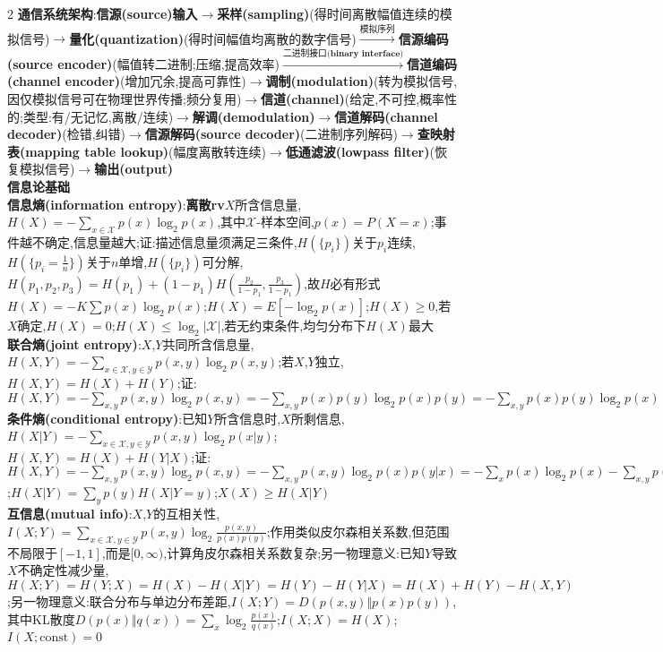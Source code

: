 \documentclass[UTF8,a4paper,10pt]{article}
\providecommand{\abs}[1]{\left\lvert#1\right\rvert}
\begin{document}
\scriptsize
\begin{multicols*}{2}
\noindent\textbf{通信系统架构}:\textbf{信源(source)输入}$\rightarrow$\textbf{采样(sampling)}(得时间离散幅值连续的模拟信号)$\rightarrow$\textbf{量化(quantization)}(得时间幅值均离散的数字信号)$\overset{\textbf{模拟序列}}{\longrightarrow}$\textbf{信源编码(source encoder)}(幅值转二进制;压缩,提高效率)$\overset{\textbf{二进制接口(binary interface)}}{\longrightarrow}$\textbf{信道编码(channel encoder)}(增加冗余,提高可靠性)$\rightarrow$\textbf{调制(modulation)}(转为模拟信号,因仅模拟信号可在物理世界传播;频分复用)$\rightarrow$\textbf{信道(channel)}(给定,不可控,概率性的;类型:有/无记忆,离散/连续)$\rightarrow$\textbf{解调(demodulation)}$\rightarrow$\textbf{信道解码(channel decoder)}(检错,纠错)$\rightarrow$\textbf{信源解码(source decoder)}(二进制序列解码)$\rightarrow$\textbf{查映射表(mapping table lookup)}(幅度离散转连续)$\rightarrow$\textbf{低通滤波(lowpass filter)}(恢复模拟信号)$\rightarrow$\textbf{输出(output)}\\
\textbf{信息论基础}\hrulefill\\
\textbf{信息熵(information entropy)}:\textbf{离散rv}$X$所含信息量,$H(X)=-\sum_{x\in\mathcal{X}}p(x)\log_2p(x)$,其中$\mathcal{X}$-样本空间,$p(x)=P(X=x)$;事件越不确定,信息量越大;证:描述信息量须满足三条件,$H(\{p_i\})$关于$p_i$连续,$H(\{p_i=\frac{1}{n}\})$关于$n$单增,$H(\{p_i\})$可分解,$H(p_1,p_2,p_3)=H(p_1)+(1-p_1)H(\frac{p_2}{1-p_1},\frac{p_3}{1-p_1})$,故$H$必有形式$H(X)=-K\sum p(x)\log_2p(x)$;$H(X)=E[-\log_2p(x)]$;$H(X)\geq 0$,若$X$确定,$H(X)=0$;$H(X)\leq\log_2\abs{\mathcal{X}}$,若无约束条件,均匀分布下$H(X)$最大\\
\textbf{联合熵(joint entropy)}:$X$,$Y$共同所含信息量,$H(X,Y)=-\sum_{x\in\mathcal{X},y\in\mathcal{Y}}p(x,y)\log_2p(x,y)$;若$X$,$Y$独立,$H(X,Y)=H(X)+H(Y)$;证:$H(X,Y)=-\sum_{x,y}p(x,y)\log_2p(x,y)=-\sum_{x,y}p(x)p(y)\log_2p(x)p(y)=-\sum_{x,y}p(x)p(y)\log_2p(x)-\sum_{x,y}p(x)p(y)\log_2p(y)=-\sum_xp(x)\log_2p(x)-\sum_yp(y)\log_2p(y)=H(X)+H(Y)$\\
\textbf{条件熵(conditional entropy)}:已知$Y$所含信息时,$X$所剩信息,$H(X\vert Y)=-\sum_{x\in\mathcal{X},y\in\mathcal{Y}}p(x,y)\log_2p(x\vert y)$;$H(X,Y)=H(X)+H(Y\vert X)$;证:$H(X,Y)=-\sum_{x,y}p(x,y)\log_2p(x,y)=-\sum_{x,y}p(x,y)\log_2p(x)p(y\vert x)=-\sum_xp(x)\log_2p(x)-\sum_{x,y}p(x,y)\log_2p(y\vert x)=H(X)+H(Y\vert X)$;$H(X\vert Y)=\sum_yp(y)H(X\vert Y=y)$;$X(X)\geq H(X\vert Y)$\\
\textbf{互信息(mutual info)}:$X$,$Y$的互相关性,$I(X;Y)=\sum_{x\in\mathcal{X},y\in\mathcal{Y}}p(x,y)\log_2\frac{p(x,y)}{p(x)p(y)}$;作用类似皮尔森相关系数,但范围不局限于$[-1,1]$,而是$[0,\infty)$,计算角皮尔森相关系数复杂;另一物理意义:已知$Y$导致$X$不确定性减少量,$H(X;Y)=H(Y;X)=H(X)-H(X\vert Y)=H(Y)-H(Y\vert X)=H(X)+H(Y)-H(X,Y)$;另一物理意义:联合分布与单边分布差距,$I(X;Y)=D(p(x,y)\Vert p(x)p(y))$,其中KL散度$D(p(x)\Vert q(x))=\sum_x\log_2\frac{p(x)}{q(x)}$;$I(X;X)=H(X)$;$I(X;\text{const})=0$\\

\end{multicols*}
\end{document}
